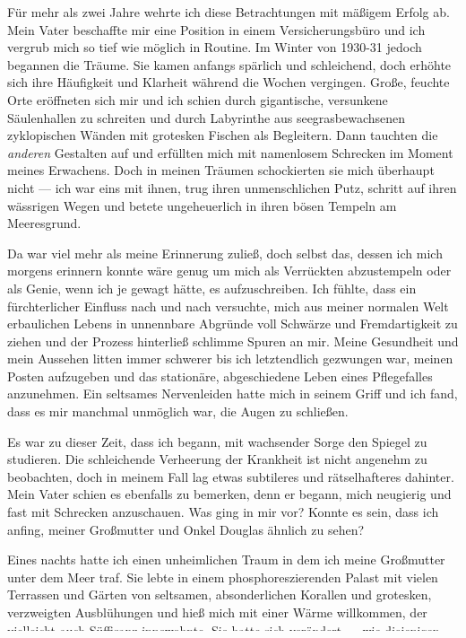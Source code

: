 Für mehr als zwei Jahre wehrte ich diese Betrachtungen mit mäßigem Erfolg ab. Mein Vater beschaffte mir eine Position in einem Versicherungsbüro und ich vergrub mich so tief wie möglich in Routine. Im Winter von 1930-31 jedoch begannen die Träume. Sie kamen anfangs spärlich und schleichend, doch erhöhte sich ihre Häufigkeit und Klarheit während die Wochen vergingen. Große, feuchte Orte eröffneten sich mir und ich schien durch gigantische, versunkene Säulenhallen zu schreiten und durch Labyrinthe aus seegrasbewachsenen zyklopischen Wänden mit grotesken Fischen als Begleitern. Dann tauchten die \textit{anderen}  Gestalten auf und erfüllten mich mit namenlosem Schrecken im Moment meines Erwachens. Doch in meinen Träumen schockierten sie mich überhaupt nicht --- ich war eins mit ihnen, trug ihren unmenschlichen Putz, schritt auf ihren wässrigen Wegen und betete ungeheuerlich in ihren bösen Tempeln am Meeresgrund.

Da war viel mehr als meine Erinnerung zuließ, doch selbst das, dessen ich mich morgens erinnern konnte wäre genug um mich als Verrückten abzustempeln oder als Genie, wenn ich je gewagt hätte, es aufzuschreiben. Ich fühlte, dass ein fürchterlicher Einfluss nach und nach versuchte, mich aus meiner normalen Welt erbaulichen Lebens in unnennbare Abgründe voll Schwärze und Fremdartigkeit zu ziehen und der Prozess hinterließ schlimme Spuren an mir. Meine Gesundheit und mein Aussehen litten immer schwerer bis ich letztendlich gezwungen war, meinen Posten aufzugeben und das stationäre, abgeschiedene Leben eines Pflegefalles anzunehmen. Ein seltsames Nervenleiden hatte mich in seinem Griff und ich fand, dass es mir manchmal unmöglich war, die Augen zu schließen.

Es war zu dieser Zeit, dass ich begann, mit wachsender Sorge den Spiegel zu studieren. Die schleichende Verheerung der Krankheit ist nicht angenehm zu beobachten, doch in meinem Fall lag etwas subtileres und rätselhafteres dahinter. Mein Vater schien es ebenfalls zu bemerken, denn er begann, mich neugierig und fast mit Schrecken anzuschauen. Was ging in mir vor? Konnte es sein, dass ich anfing, meiner Großmutter und Onkel Douglas ähnlich zu sehen?

Eines nachts hatte ich einen unheimlichen Traum in dem ich meine Großmutter unter dem Meer traf. Sie lebte in einem phosphoreszierenden Palast mit vielen Terrassen und Gärten von seltsamen, absonderlichen Korallen und grotesken, verzweigten Ausblühungen und hieß mich mit einer Wärme willkommen, der vielleicht auch Süffisanz innewohnte. Sie hatte sich verändert --- wie diejenigen, die es zum Wasser zieht sich verändern --- und hatte mir erzählt, dass sie nie gestorben sei. Viel mehr war sie an einen Ort gezogen, von dem ihr Sohn ebenfalls erfahren hatte und entflohen in ein Reich, dessen Wunder --- ihm ebenfalls bestimmt --- er mit einer rauchenden Pistole verschmäht hatte. Dies sollte ebenfalls mein Reich sein --- ich konnte dem nicht entkommen. Ich würde nie sterben, sondern mit denen zusammenleben, die schon lebten bevor je ein Mensch auf Erden schritt.

